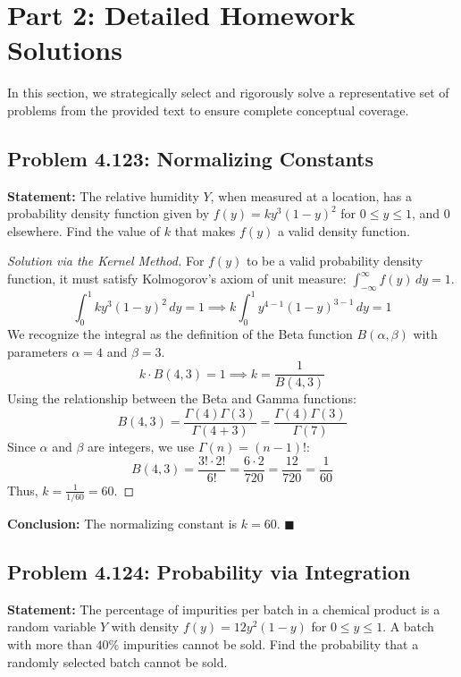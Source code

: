 \documentclass[11pt, a4paper]{article}
\theoremstyle{definition}
\theoremstyle{remark}
\begin{document}
\newpage
\section{Part 2: Detailed Homework Solutions}

In this section, we strategically select and rigorously solve a representative set of problems from the provided text to ensure complete conceptual coverage.

\subsection{Problem 4.123: Normalizing Constants}
\textbf{Statement:} The relative humidity $Y$, when measured at a location, has a probability density function given by $f(y) = k y^3 (1-y)^2$ for $0 \le y \le 1$, and $0$ elsewhere. Find the value of $k$ that makes $f(y)$ a valid density function.

\begin{proof}[Solution via the Kernel Method]
For $f(y)$ to be a valid probability density function, it must satisfy Kolmogorov's axiom of unit measure: $\int_{-\infty}^{\infty} f(y) \, dy = 1$.
\[
\int_0^1 k y^3 (1-y)^2 \, dy = 1 \implies k \int_0^1 y^{4-1} (1-y)^{3-1} \, dy = 1
\]
We recognize the integral as the definition of the Beta function $B(\alpha, \beta)$ with parameters $\alpha = 4$ and $\beta = 3$.
\[
k \cdot B(4, 3) = 1 \implies k = \frac{1}{B(4, 3)}
\]
Using the relationship between the Beta and Gamma functions:
\[
B(4, 3) = \frac{\Gamma(4)\Gamma(3)}{\Gamma(4+3)} = \frac{\Gamma(4)\Gamma(3)}{\Gamma(7)}
\]
Since $\alpha$ and $\beta$ are integers, we use $\Gamma(n) = (n-1)!$:
\[
B(4, 3) = \frac{3! \cdot 2!}{6!} = \frac{6 \cdot 2}{720} = \frac{12}{720} = \frac{1}{60}
\]
Thus, $k = \frac{1}{1/60} = 60$.
\end{proof}
\textbf{Conclusion:} The normalizing constant is $k = 60$. $\blacksquare$

\subsection{Problem 4.124: Probability via Integration}
\textbf{Statement:} The percentage of impurities per batch in a chemical product is a random variable $Y$ with density $f(y) = 12y^2(1-y)$ for $0 \le y \le 1$. A batch with more than $40\%$ impurities cannot be sold. Find the probability that a randomly selected batch cannot be sold.
\end{document}
